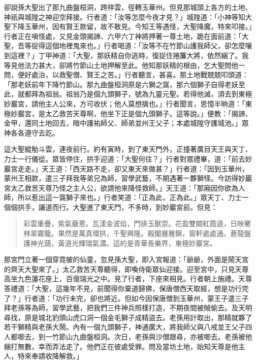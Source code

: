 卻說孫大聖出了那九曲盤桓洞，跨祥雲，徑轉玉華州。但見那城頭上各方的土地、神祇與城隍之神迎空拜接。行者道：「汝等怎麼今夜才見？」城隍道：「小神等知大聖下降玉華州，因有賢王款留，故不敢見。今知王等遇怪，大聖降魔，特來叩接。」行者正在嗔怪處，又見金頭揭諦、六甲六丁神將押著一尊土地，跪在面前道：「大聖，吾等捉得這個地裡鬼來也。」行者喝道：「汝等不在竹節山護我師父，卻怎麼嚷到這裡？」丁甲神道：「大聖，那妖精自你逃時，復捉住捲簾大將，依然綑了。我等見他法力甚大，卻將竹節山土地押解至此。他知那妖精的根由，乞大聖問他一問，便好處治，以救聖僧、賢王之苦。」行者聽言，甚喜。那土地戰兢兢叩頭道：「那老妖前年下降竹節山。那九曲盤桓洞原是六獅之窩，那六個獅子自得老妖至此，就都拜為祖翁。祖翁乃是個九頭獅子，號為九靈元聖。若得他滅，須去到東極妙巖宮，請他主人公來，方可收伏；他人莫想擒也。」行者聞言，思憶半晌道：「東極妙巖宮，是太乙救苦天尊啊，他坐下正是個九頭獅子。這等說。」便教：「揭諦、金甲，還同土地回去，暗中護祐師父、師弟並州王父子；本處城隍守護城池。」眾神各各遵守去訖。

這大聖縱觔斗雲，連夜前行。約有寅時，到了東天門外，正撞著廣目天王與天丁、力士一行儀從。眾皆停住，拱手迎道：「大聖何往？」行者對眾禮畢，道：「前去妙巖宮走走。」天王道：「西天路不走，卻又東天來做甚？」行者道：「因到玉華州，蒙州王相款，遣三子拜我等弟兄為師，習學武藝，不期遇著一夥獅怪。今訪得妙巖宮太乙救苦天尊乃怪之主人公，欲請他來降怪救師。」天王道：「那廂因你欲為人師，所以惹出這一窩獅子來也。」行者笑道：「正為此，正為此。」眾天丁、力士一個個拱手，讓道而行。大聖進了東天門，不多時，到妙巖宮前。但見：
\begin{quote}
彩雲重疊，紫氣蘢蔥。瓦漾金波焰，門排玉獸崇。花盈雙闕紅霞遶，日映騫林翠霧籠。果然是萬真環拱，千聖興隆。殿閣層層錦，窗軒處處通。蒼龍盤護神光藹，黃道光輝瑞氣濃。這的是青華長樂界，東極妙巖宮。
\end{quote}

那宮門立著一個穿霓帔的仙童，忽見孫大聖，即入宮報道：「爺爺，外面是鬧天宮的齊天大聖來了。」太乙救苦天尊聽得，即喚侍衛眾仙迎接。迎至宮中，只見天尊高坐九色蓮花座上，百億瑞光之中。見了行者，下座來相見。行者朝上施禮。天尊答禮道：「大聖，這幾年不見，前聞得你棄道歸佛，保唐僧西天取經，想是功行完了？」行者道：「功行未完，卻也將近。但如今因保唐僧到玉華州，蒙王子遣三子拜老孫等為師，習學武藝，把我們三件神兵照樣打造，不期夜間被賊偷去。及天明尋找，原是城北豹頭山虎口洞一個金毛獅子成精盜去。老孫用計取出，那精就夥了若干獅精與老孫大鬧。內有一個九頭獅子，神通廣大，將我師父與八戒並王父子四人都啣去，到一竹節山九曲盤桓洞。次日，老孫與沙僧跟尋，亦被啣去。老孫被他綑打無數，幸而弄法走了。他們正在彼處受罪。問及當坊土地，始知天尊是他主人，特來奉請收降解救。」

